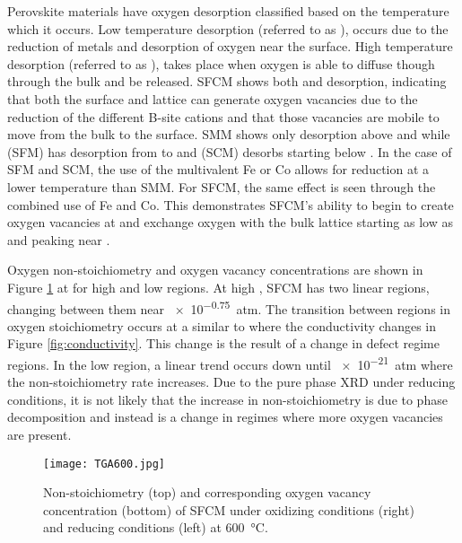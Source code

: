     Perovskite materials have oxygen desorption classified based on the temperature which it occurs.
    Low temperature desorption (referred to as \textalpha{}), occurs due to the reduction of metals and desorption of oxygen near the surface.
    High temperature desorption (referred to as \textbeta{}), takes place when oxygen is able to diffuse though through the bulk and be released.\cite{Levasseur2009}
    SFCM shows both \textalpha{} and \textbeta{} desorption, indicating that both the surface and lattice can generate oxygen vacancies due to the reduction of the different B-site cations and that those vacancies are mobile to move from the bulk to the surface.
    SMM shows only \textbeta{} desorption above  and while  (SFM) has \textalpha{} desorption from  to  and  (SCM) desorbs starting below .\cite{Liu2011, Vasala2010}
    In the case of SFM and SCM, the use of the multivalent Fe or Co allows for reduction at a lower temperature than SMM.
    For SFCM, the same effect is seen through the combined use of Fe and Co.
    This demonstrates SFCM's ability to begin to create oxygen vacancies at  and exchange oxygen with the bulk lattice starting as low as  and peaking near .

    Oxygen non-stoichiometry and oxygen vacancy concentrations are shown in Figure \ref{fig:TGA600} at  for high and low  regions.
    At high , SFCM has two linear regions, changing between them near \SI{e-0.75}{atm}.
    The transition between regions in oxygen stoichiometry occurs at a similar  to where the conductivity changes in Figure \ref{fig:conductivity}.
    This change is the result of a change in defect regime regions.
    In the low  region, a linear trend occurs down until \SI{e-21}{atm} where the non-stoichiometry rate increases.
    Due to the pure phase XRD under reducing conditions, it is not likely that the increase in non-stoichiometry is due to phase decomposition and instead is a change in regimes where more oxygen vacancies are present.

    \begin{figure}
      \texttt{[image: TGA600.jpg]}
      \caption{Non-stoichiometry (top) and corresponding oxygen vacancy concentration (bottom) of SFCM under oxidizing conditions (right) and reducing conditions (left) at \SI{600}{\celsius}.}
      \label{fig:TGA600}
    \end{figure}


